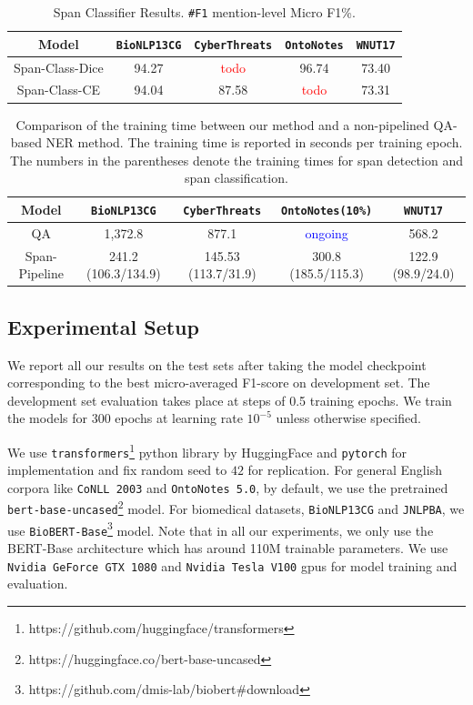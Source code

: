 \begin{table}[h!]
\centering
\begin{small}
\begin{tabular}{ccccc}\toprule
 \textbf{Model} & \texttt{BioNLP13CG} & \texttt{CyberThreats} & \texttt{OntoNotes} & \texttt{WNUT17} \\ \toprule 
Span-Class-Dice & 94.27 & \textcolor{red}{todo} &  96.74 & 73.40  \\
Span-Class-CE     & 94.04 & 87.58 & \textcolor{red}{todo} & 73.31  \\
\bottomrule
\end{tabular}
\caption{Span Classifier Results. \texttt{\#F1} mention-level Micro F1\%.}
\label{tab:class_ablation}
\end{small}
\end{table}

\begin{table}[h!]
\centering
\begin{small}
\begin{tabular}{ccccc}\toprule
 \textbf{Model} & \texttt{BioNLP13CG} & \texttt{CyberThreats} & \texttt{OntoNotes(10\%)} & \texttt{WNUT17} \\ \toprule 
QA                & 1,372.8 & 877.1 & \textcolor{blue}{ongoing}  & 568.2\\
Span-Pipeline     & 241.2 (106.3/134.9) & 145.53 (113.7/31.9) & 300.8 (185.5/115.3)  & 122.9 (98.9/24.0)\\
\bottomrule
\end{tabular}
\caption{Comparison of the training time between our method and a non-pipelined QA-based NER method. 
    The training time is reported in seconds per training epoch. The numbers in the parentheses denote the training times for span detection and span classification. }
\label{tab:train_time_ablation}
\end{small}
\end{table}

\subsection{Experimental Setup}
We report all our results on the test sets after taking the model checkpoint corresponding to the best micro-averaged F1-score on development set. The development set evaluation takes place at steps of 0.5 training epochs. We train the models for $300$ epochs at learning rate $10^{-5}$ unless otherwise specified.

We use \texttt{transformers}\footnote{https://github.com/huggingface/transformers} python library by HuggingFace and \texttt{pytorch} for implementation and fix random seed to $42$ for replication. For general English corpora like \texttt{CoNLL 2003} and \texttt{OntoNotes 5.0}, by default, we use the pretrained \texttt{bert-base-uncased}\footnote{https://huggingface.co/bert-base-uncased} model. For biomedical datasets, \texttt{BioNLP13CG} and \texttt{JNLPBA}, we use \texttt{BioBERT-Base}\footnote{https://github.com/dmis-lab/biobert\#download} model. Note that in all our experiments, we only use the BERT-Base architecture which has around 110M trainable parameters. We use \texttt{Nvidia GeForce GTX 1080} and \texttt{Nvidia Tesla V100} gpus for model training and evaluation.

